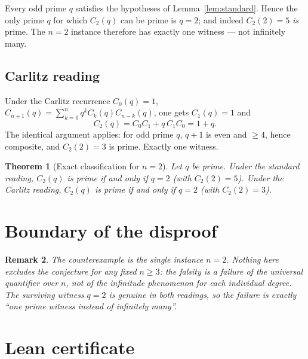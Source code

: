 \documentclass[11pt]{article}
\newtheorem{theorem}{Theorem}
\newtheorem{remark}[theorem]{Remark}
\begin{document}
Every odd prime $q$ satisfies the hypotheses of
Lemma~\ref{lem:standard}. Hence the only prime $q$ for which $C_2(q)$ can be
prime is $q = 2$; and indeed $C_2(2) = 5$ \emph{is} prime. The $n = 2$
instance therefore has exactly one witness --- not infinitely many.

\subsection{Carlitz reading}

Under the Carlitz recurrence $C_0(q) = 1$,
$C_{n+1}(q) = \sum_{k=0}^{n} q^k C_k(q) C_{n-k}(q)$, one gets
$C_1(q) = 1$ and
\[
C_2(q) = C_0 C_1 + q\, C_1 C_0 = 1 + q .
\]
The identical argument applies: for odd prime $q$, $q + 1$ is even and
$\ge 4$, hence composite, and $C_2(2) = 3$ is prime. Exactly one witness.

\begin{theorem}[Exact classification for $n = 2$]\label{thm:classification}
Let $q$ be prime. Under the standard reading, $C_2(q)$ is prime if and only
if $q = 2$ (with $C_2(2) = 5$). Under the Carlitz reading, $C_2(q)$ is prime
if and only if $q = 2$ (with $C_2(2) = 3$).
\end{theorem}

\section{Boundary of the disproof}

\begin{remark}
The counterexample is the single instance $n = 2$. Nothing here excludes the
conjecture for any fixed $n \ge 3$: the falsity is a failure of the
universal quantifier over $n$, not of the infinitude phenomenon for each
individual degree. The surviving witness $q = 2$ is genuine in both
readings, so the failure is exactly ``one prime witness instead of
infinitely many''.
\end{remark}

\section{Lean certificate}
\end{document}
